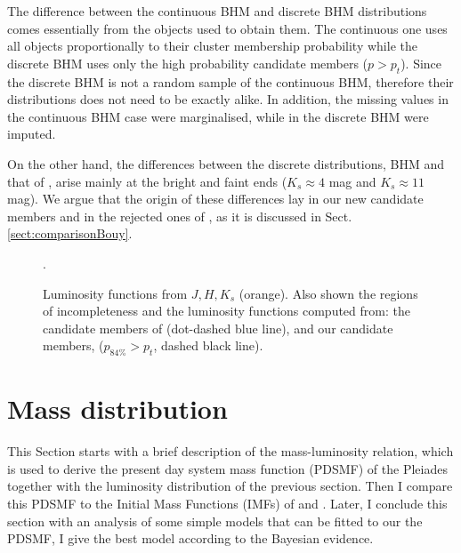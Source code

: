 The difference between the continuous BHM  and discrete BHM distributions comes essentially from the objects used to obtain them. The continuous one uses all objects proportionally to their cluster membership probability while the discrete BHM uses only the high probability candidate members ($p>p_t$). Since the discrete BHM is not a random sample of the continuous BHM, therefore their distributions does not need to be exactly alike. In addition, the missing values in the continuous BHM case were marginalised, while in the discrete BHM were imputed.
 
On the other hand, the differences between the discrete distributions, BHM and that of \citet{Bouy2015}, arise mainly at the bright and faint ends ($K_s\approx 4$ mag and $K_s\approx11$ mag). We argue that the origin of these differences lay in our new candidate members and in the rejected ones of \citet{Bouy2015}, as it is discussed in Sect. \ref{sect:comparisonBouy}.

\begin{figure}[htbp]
\begin{center}
\caption{Luminosity functions from $J,H,K_s$ (orange). Also shown the regions of incompleteness and the luminosity functions computed from: the candidate members of \citet{Bouy2015} (dot-dashed blue line), and our candidate members, ($p_{84\%}>p_t$, dashed black line).}
\label{figure:Luminosities}.
\end{center}
\end{figure}

\section{Mass distribution}
This Section starts with a brief description of the mass-luminosity relation, which is used to derive the present day system mass function (PDSMF) of the Pleiades together with the luminosity distribution of the previous section. Then I compare this PDSMF to the Initial Mass Functions (IMFs) of \citet{Chabrier2005} and \citet{Thies2007}. Later, I conclude this section with an analysis of some simple models that can be fitted to our the PDSMF, I give the best model according to the Bayesian evidence.

